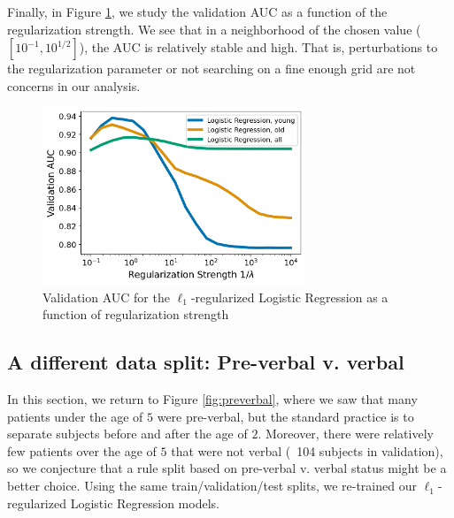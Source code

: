 \documentclass[11pt, letterpaper]{amsart}
\let\Oldsubsection\subsection
\renewcommand{\subsection}{\FloatBarrier\Oldsubsection}
\begin{document}
Finally, in Figure \ref{fig:lr_lambda_auc}, we study the validation AUC as a function of the regularization strength. We see that in a neighborhood of the chosen value ($[10^{-1}, 10^{1/2}]$), the AUC is relatively stable and high. That is, perturbations to the regularization parameter or not searching on a fine enough grid are not concerns in our analysis. 
\begin{figure}
	\centering
	\includegraphics[width=0.7\textwidth]{lr_auc_lambda.png}
	\caption{Validation AUC for the $\ell_1$-regularized Logistic Regression as a function of regularization strength}\label{fig:lr_lambda_auc}
\end{figure}


\subsection{A different data split: Pre-verbal v. verbal}

In this section, we return to Figure \ref{fig:preverbal}, where we saw that many patients under the age of $5$ were pre-verbal, but the standard practice is to separate subjects before and after the age of $2$. Moreover, there were relatively few patients over the age of $5$ that were not verbal (~104 subjects in validation), so we conjecture that a rule split based on pre-verbal v. verbal status might be a better choice. Using the same train/validation/test splits, we re-trained our $\ell_1$-regularized Logistic Regression models. 
\end{document}
